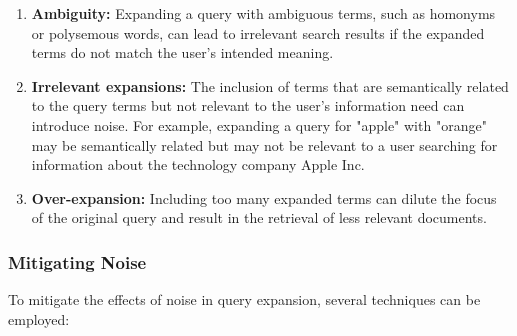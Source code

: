 \documentclass[12pt]{article}
\begin{document}
\begin{enumerate}
\item \textbf{Ambiguity:} Expanding a query with ambiguous terms, such as homonyms or polysemous words, can lead to irrelevant search results if the expanded terms do not match the user's intended meaning.

\item \textbf{Irrelevant expansions:} The inclusion of terms that are semantically related to the query terms but not relevant to the user's information need can introduce noise. For example, expanding a query for "apple" with "orange" may be semantically related but may not be relevant to a user searching for information about the technology company Apple Inc.

\item \textbf{Over-expansion:} Including too many expanded terms can dilute the focus of the original query and result in the retrieval of less relevant documents.
\end{enumerate}

\subsubsection{Mitigating Noise}
\label{sec:mitigating_noise}

To mitigate the effects of noise in query expansion, several techniques can be employed:
\end{document}
